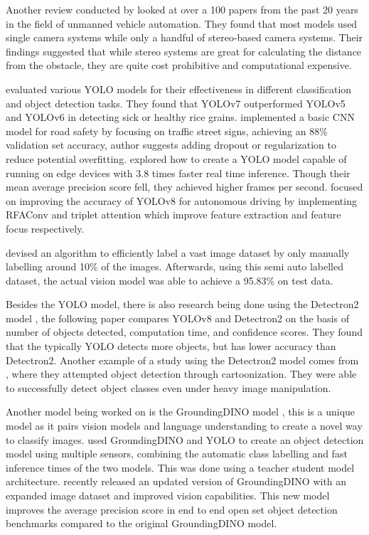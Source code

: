\documentclass[stu,12pt,floatsintext]{apa7}
\begin{document}
Another review conducted by \textcite{badrloo_image-based_2022} looked at over a 100 papers from the past 20 years in the field of unmanned vehicle automation. They found that most models used single camera systems while only a handful of stereo-based camera systems. Their findings suggested that while stereo systems are great for calculating the distance from the obstacle, they are quite cost prohibitive and computational expensive.

\textcite{quach_evaluating_2023} evaluated various YOLO models for their effectiveness in different classification and object detection tasks. They found that YOLOv7 outperformed YOLOv5 and YOLOv6 in detecting sick or healthy rice grains. \textcite{hindarto_enhancing_2023} implemented a basic CNN model for road safety by focusing on traffic street signs, achieving an 88\% validation set accuracy, author suggests adding dropout or regularization to reduce potential overfitting. \textcite{pedoeem_yolo-lite_2018} explored how to create a YOLO model capable of running on edge devices with 3.8 times faster real time inference. Though their mean average precision score fell, they achieved higher frames per second. \textcite{ling_optimization_2024} focused on improving the accuracy of YOLOv8 for autonomous driving by implementing RFAConv and triplet attention which improve feature extraction and feature focus respectively.

\textcite{hu_novel_2019} devised an algorithm to efficiently label a vast image dataset by only manually labelling around 10\% of the images. Afterwards, using this semi auto labelled dataset, the actual vision model was able to achieve a 95.83\% on test data.

Besides the YOLO model, there is also research being done using the Detectron2 model \parencite{wu2019detectron2}, the following paper \parencite{wadhwa_comparison_2023} compares YOLOv8 and Detectron2 on the basis of number of objects detected, computation time, and confidence scores. They found that the typically YOLO detects more objects, but has lower accuracy than Detectron2. Another example of a study using the Detectron2 model comes from \textcite{abhishek_detectron2_2021}, where they attempted object detection through cartoonization. They were able to successfully detect object classes even under heavy image manipulation.

Another model being worked on is the GroundingDINO model \parencite{liu_grounding_2024}, this is a unique model as it pairs vision models and language understanding to create a novel way to classify images. \textcite{son_teacherstudent_2024} used GroundingDINO and YOLO to create an object detection model using multiple sensors, combining the automatic class labelling and fast inference times of the two models. This was done using a teacher student model architecture. \textcite{ren_grounding_2024} recently released an updated version of GroundingDINO with an expanded image dataset and improved vision capabilities. This new model improves the average precision score in end to end open set object detection benchmarks compared to the original GroundingDINO model.
\end{document}
